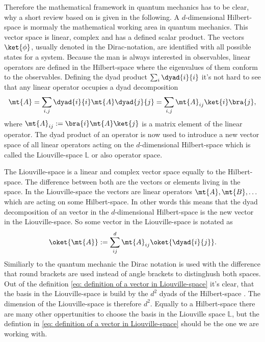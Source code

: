 Therefore the mathematical framework in quantum mechanics has to be clear, why a short review based on \cite{Audretsch} is given in the following.
A $d$-dimensional Hilbert-space is mormaly the mathematical working area in quantum mechanics.
This vector space is linear, complex and has a defined scalar product.
The vectors $\ket{\phi}$, usually denoted in the Dirac-notation, are identified with all possible states for a system.
Because the man is always interested in observables, linear operators are defined in the Hilbert-space where the eigenvalues of them conform to the observables.
Defining the dyad product $\sum_{i} \dyad{i}{i}$ it's not hard to see that any linear operator occupies a dyad decomposition
%
\begin{align}
	\mt{A} = \sum\limits_{i,j} \dyad{i}{i} \mt{A} \dyad{j}{j} = \sum\limits_{i,j} \mt{A}_{ij} \ket{i} \bra{j},
	\label{eq: dyad product}
\end{align}
%
where $\mt{A}_{ij} := \bra{i}\mt{A}\ket{j}$ is a matrix element of the linear operator.
The dyad product of an operator is now used to introduce a new vector space of all linear operators acting on the $d$-dimensional Hilbert-space which is called the Liouville-space $\mathbb{L}$ or also operator space.

The Liouville-space is a linear and complex vector space equally to the Hilbert-space.
The difference between both are the vectors or elements living in the space.
In the Liouville-space the vectors are linear operators $\mt{A}, \mt{B}, \dots$ which are acting on some Hilbert-space.
In other words this means that the dyad decomposition of an vector in the $d$-dimensional Hilbert-space is the new vector in the Liouville-space.
So some vector in the Liouville-space is notated as
%
\begin{align}
	\oket{\mt{A}} := \sum\limits_{ij}^{d} \mt{A}_{ij} \oket{\dyad{i}{j}}.
	\label{eq: definition of a vector in Liouville-space}
\end{align}
%
Similiarly to the quantum mechanic the Dirac notation is used with the difference that round brackets are used instead of angle brackets to distinghush both spaces.
Out of the definition \eqref{eq: definition of a vector in Liouville-space} it's clear, that the basis in the Liouville-space is build by the $d^{2}$ dyads of the Hilbert-space .
The dimension of the Liouville-space is therefore $d^{2}$.
Equally to a Hilbert-space there are many other oppertunities to choose the basis in the Liouville space $\mathbb{L}$, but the defintion in \eqref{eq: definition of a vector in Liouville-space} should be the one we are working with.

